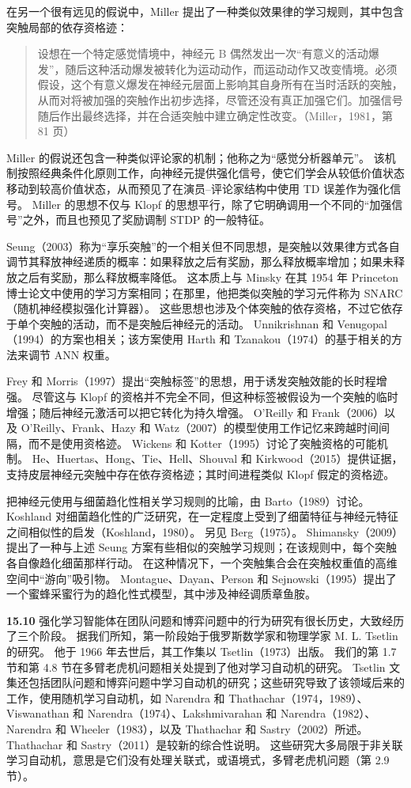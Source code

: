 \documentclass[UTF8, 12pt, fontset=fandol, oneside]{ctexart}
\begin{document}
在另一个很有远见的假说中，Miller 提出了一种类似效果律的学习规则，其中包含突触局部的依存资格迹：
\begin{quote}
设想在一个特定感觉情境中，神经元 B 偶然发出一次“有意义的活动爆发”，随后这种活动爆发被转化为运动动作，而运动动作又改变情境。必须假设，这个有意义爆发在神经元层面上影响其自身所有在当时活跃的突触，从而对将被加强的突触作出初步选择，尽管还没有真正加强它们。加强信号随后作出最终选择，并在合适突触中建立确定性改变。（Miller，1981，第 81 页）
\end{quote}
Miller 的假说还包含一种类似评论家的机制；他称之为“感觉分析器单元”。
该机制按照经典条件化原则工作，向神经元提供强化信号，使它们学会从较低价值状态移动到较高价值状态，从而预见了在演员--评论家结构中使用 TD 误差作为强化信号。
Miller 的思想不仅与 Klopf 的思想平行，除了它明确调用一个不同的“加强信号”之外，而且也预见了奖励调制 STDP 的一般特征。

Seung（2003）称为“享乐突触”的一个相关但不同思想，是突触以效果律方式各自调节其释放神经递质的概率：如果释放之后有奖励，那么释放概率增加；如果未释放之后有奖励，那么释放概率降低。
这本质上与 Minsky 在其 1954 年 Princeton 博士论文中使用的学习方案相同；在那里，他把类似突触的学习元件称为 SNARC（随机神经模拟强化计算器）。
这些思想也涉及个体突触的依存资格，不过它依存于单个突触的活动，而不是突触后神经元的活动。
Unnikrishnan 和 Venugopal（1994）的方案也相关；该方案使用 Harth 和 Tzanakou（1974）的基于相关的方法来调节 ANN 权重。

Frey 和 Morris（1997）提出“突触标签”的思想，用于诱发突触效能的长时程增强。
尽管这与 Klopf 的资格并不完全不同，但这种标签被假设为一个突触的临时增强；随后神经元激活可以把它转化为持久增强。
O'Reilly 和 Frank（2006）以及 O'Reilly、Frank、Hazy 和 Watz（2007）的模型使用工作记忆来跨越时间间隔，而不是使用资格迹。
Wickens 和 Kotter（1995）讨论了突触资格的可能机制。
He、Huertas、Hong、Tie、Hell、Shouval 和 Kirkwood（2015）提供证据，支持皮层神经元突触中存在依存资格迹；其时间进程类似 Klopf 假定的资格迹。

把神经元使用与细菌趋化性相关学习规则的比喻，由 Barto（1989）讨论。
Koshland 对细菌趋化性的广泛研究，在一定程度上受到了细菌特征与神经元特征之间相似性的启发（Koshland，1980）。
另见 Berg（1975）。
Shimansky（2009）提出了一种与上述 Seung 方案有些相似的突触学习规则；在该规则中，每个突触各自像趋化细菌那样行动。
在这种情况下，一个突触集合会在突触权重值的高维空间中“游向”吸引物。
Montague、Dayan、Person 和 Sejnowski（1995）提出了一个蜜蜂采蜜行为的趋化性式模型，其中涉及神经调质章鱼胺。

\noindent\textbf{15.10}
强化学习智能体在团队问题和博弈问题中的行为研究有很长历史，大致经历了三个阶段。
据我们所知，第一阶段始于俄罗斯数学家和物理学家 M. L. Tsetlin 的研究。
他于 1966 年去世后，其工作集以 Tsetlin（1973）出版。
我们的第 1.7 节和第 4.8 节在多臂老虎机问题相关处提到了他对学习自动机的研究。
Tsetlin 文集还包括团队问题和博弈问题中学习自动机的研究；这些研究导致了该领域后来的工作，使用随机学习自动机，如 Narendra 和 Thathachar（1974，1989）、Viswanathan 和 Narendra（1974）、Lakshmivarahan 和 Narendra（1982）、Narendra 和 Wheeler（1983），以及 Thathachar 和 Sastry（2002）所述。
Thathachar 和 Sastry（2011）是较新的综合性说明。
这些研究大多局限于非关联学习自动机，意思是它们没有处理关联式，或语境式，多臂老虎机问题（第 2.9 节）。
\end{document}

